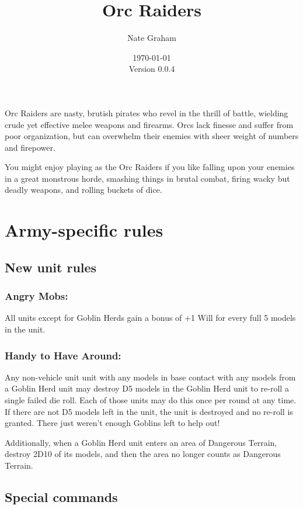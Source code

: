 \documentclass[landscape]{extarticle}
\begin{document}
\title{Orc Raiders}
\author{Nate Graham}
\date{\today\\ Version 0.0.4}

\maketitle

Orc Raiders are nasty, brutish pirates who revel in the thrill of battle, wielding crude yet effective melee weapons and firearms. Orcs lack finesse and suffer from poor organization, but can overwhelm their enemies with sheer weight of numbers and firepower.

You might enjoy playing as the Orc Raiders if you like falling upon your enemies in a great monstrous horde, smashing things in brutal combat, firing wacky but deadly weapons, and rolling buckets of dice.

\section*{Army-specific rules}

\subsection*{New unit rules}

\subsubsection*{Angry Mobs:} All units except for Goblin Herds gain a bonus of +1 Will for every full 5 models in the unit.

\subsubsection*{Handy to Have Around:} Any non-vehicle unit unit with any models in base contact with any models from a Goblin Herd unit may destroy D5 models in the Goblin Herd unit to re-roll a single failed die roll. Each of those units may do this once per round at any time. If there are not D5 models left in the unit, the unit is destroyed and no re-roll is granted. There just weren't enough Goblins left to help out!

Additionally, when a Goblin Herd unit enters an area of Dangerous Terrain, destroy 2D10 of its models, and then the area no longer counts as Dangerous Terrain.

\subsection*{Special commands}
\end{document}
